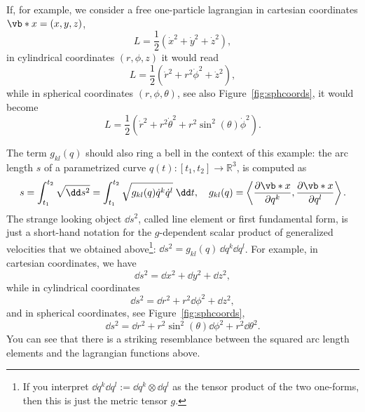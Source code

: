 \documentclass[english,fontsize=11pt,paper=b5]{scrbook}
\numberwithin{equation}{chapter}
\theoremstyle{definition}
\begin{document}
    If, for example, we consider a free one-particle lagrangian in cartesian coordinates $\vb*{x} = (x,y,z)$,
    \begin{equation}
      L = \frac 12 (\dot x^2 + \dot y^2 + \dot z^2),
    \end{equation}
    in cylindrical coordinates $(r,\phi,z)$ it would read
    \begin{equation}
      L = \frac 12 (\dot r^2 + r^2 \dot \phi^2 + \dot z^2),
    \end{equation}
    while in spherical coordinates $(r,\phi,\theta)$, see also Figure~\ref{fig:sphcoords}, it would become
    \begin{equation}
      L = \frac 12 (\dot r^2 + r^2 \dot \theta^2 + r^2 \sin^2(\theta) \dot \phi^2).
    \end{equation}

    The term $g_{kl} (q)$ should also ring a bell in the context of this example: the arc length $s$ of a parametrized curve $q(t) : [t_1,t_2] \to \mathbb{R}^3$, is computed as
    \begin{equation}\label{eq:arclen}
      \begin{aligned}
        s = \int_{t_1}^{t_2} \sqrt{\dd s^2} = \int_{t_1}^{t_2} \sqrt{g_{kl}(q)\dot q^k \dot q^l} \;\dd t,\quad
        g_{kl} (q) = \left\langle\frac{\partial\vb*{x}}{\partial q^k}, \frac{\partial \vb*{x}}{\partial q^l}\right\rangle.
      \end{aligned}
    \end{equation}
    The strange looking object $\dd s^2$, called line element or first fundamental form, is just a short-hand notation for the $g$-dependent scalar product of generalized velocities that we obtained above\footnote{If you interpret $\dd q^k \dd q^l := \dd q^k \otimes \dd q^l$ as the tensor product of the two one-forms, then this is just the metric tensor $g$.}: $\dd s^2 = g_{kl}(q)\, \dd q^k \dd q^l$.
    For example, in cartesian coordinates, we have
    \begin{equation}
      \dd s^2 = \dd x^2 + \dd y^2 + \dd z^2,
    \end{equation}
    while in cylindrical coordinates
    \begin{equation}
      \dd s^2 = \dd r^2 + r^2 \dd \phi^2 + \dd z^2,
    \end{equation}
    and in spherical coordinates, see Figure~\ref{fig:sphcoords},
    \begin{equation}\label{eq:spharc}
      \dd s^2 = \dd r^2 + r^2 \sin^2(\theta) \dd \phi^2 + r^2 \dd \theta^2.
    \end{equation}
    You can see that there is a striking resemblance between the squared arc length elements and the lagrangian functions above. \medskip
\end{document}
